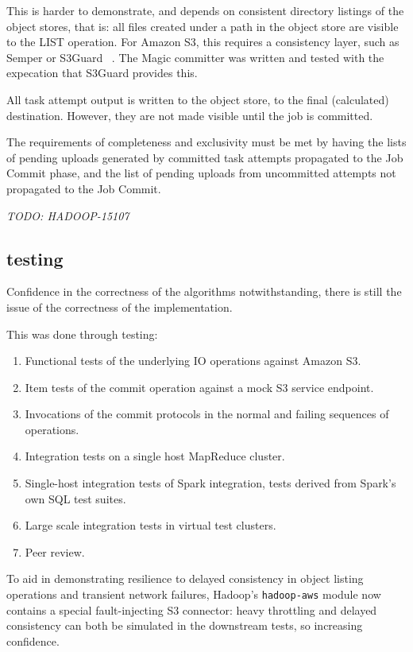 \documentclass[conference]{IEEEtran}
\begin{document}
This is harder to demonstrate, and depends on consistent directory
listings of the object stores, that is: all files created under a path
in the object store are visible to the LIST operation.
For Amazon S3, this requires a consistency layer, such as Semper or S3Guard
\ \cite{semper, S3Guard}.
The Magic committer was written and tested with the expecation that S3Guard
provides this.

All task attempt output is written to the object store, to the final (calculated)
destination.
However, they are not made visible until the job is committed.

The requirements of completeness and exclusivity must be met by
having the lists of pending uploads generated by committed task attempts propagated
to the Job Commit phase, and the list of pending uploads from uncommitted
attempts not propagated to the Job Commit.

\emph{TODO: HADOOP-15107}



\subsection{testing}\label{subsec:testing}



Confidence in the correctness of the algorithms notwithstanding, there
is still the issue of the correctness of the implementation.


This was done through testing:

\begin{enumerate}
  \item Functional tests of the underlying IO operations against Amazon S3.
  \item Item tests of the commit operation against a mock S3 service endpoint.
  \item Invocations of the commit protocols in the normal and failing sequences of operations.
  \item Integration tests on a single host MapReduce cluster.
  \item Single-host integration tests of Spark integration, tests derived from Spark's own SQL test suites.
  \item Large scale integration tests in virtual test clusters.
  \item Peer review.
\end{enumerate}

To aid in demonstrating resilience to delayed consistency in object listing
operations and transient network failures, Hadoop's \texttt{hadoop-aws} module
now contains a special fault-injecting S3 connector: heavy throttling and
delayed consistency can both be simulated in the downstream tests, so
increasing confidence.
\end{document}

